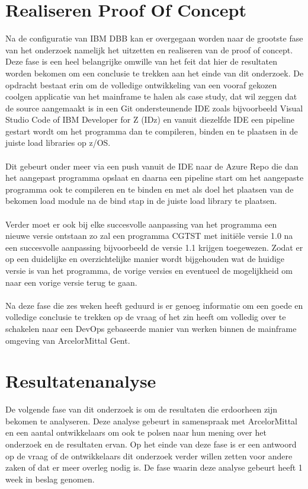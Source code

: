 \section{Realiseren Proof Of Concept}
\label{sec:poc}
Na de configuratie van IBM DBB kan er overgegaan worden naar de grootste fase van het onderzoek namelijk het uitzetten en realiseren van de proof of concept.
Deze fase is een heel belangrijke omwille van het feit dat hier de resultaten worden bekomen om een conclusie te trekken aan het einde van dit onderzoek.
De opdracht bestaat erin om de volledige ontwikkeling van een vooraf gekozen coolgen applicatie van het mainframe te halen als case study, dat wil zeggen dat de source aangemaakt is in een Git ondersteunende IDE zoals bijvoorbeeld Visual Studio Code of IBM Developer for Z (IDz) en vanuit diezelfde IDE een pipeline gestart wordt om het programma dan te compileren, binden en te plaatsen in de juiste load libraries op z/OS.
\\ \\
Dit gebeurt onder meer via een push vanuit de IDE naar de Azure Repo die dan het aangepast programma opslaat en daarna een pipeline start om het aangepaste programma ook
te compileren en te binden en met als doel het plaatsen van de bekomen load module na de bind stap in de juiste load library te plaatsen.
\\ \\
Verder moet er ook bij elke succesvolle aanpassing van het programma een nieuwe versie ontstaan zo zal een programma CGTST met initiële versie 1.0 na een succesvolle
aanpassing bijvoorbeeld de versie 1.1 krijgen toegewezen.
Zodat er op een duidelijke en overzichtelijke manier wordt bijgehouden wat de huidige versie is van het programma, de vorige versies en eventueel de mogelijkheid om naar een vorige versie terug te gaan.
\\ \\
Na deze fase die zes weken heeft geduurd is er genoeg informatie om een goede en volledige conclusie te trekken op de vraag of het zin heeft om volledig over te schakelen naar een DevOps gebaseerde manier van werken binnen de mainframe omgeving van ArcelorMittal Gent.

\section{Resultatenanalyse}
\label{sec:resulatatenanalyse}
De volgende fase van dit onderzoek is om de resultaten die erdoorheen zijn bekomen te analyseren. Deze analyse gebeurt in samenspraak met ArcelorMittal en een aantal ontwikkelaars om ook te polsen naar hun mening over het onderzoek en de resultaten ervan.
Op het einde van deze fase is er een antwoord op de vraag of de ontwikkelaars dit onderzoek verder willen zetten voor andere zaken of dat er meer overleg nodig is. 
De fase waarin deze analyse gebeurt heeft 1 week in beslag genomen.

